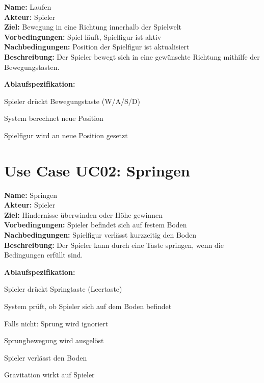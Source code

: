 \documentclass{article}
\begin{document}
\textbf{Name:} Laufen \\
\textbf{Akteur:} Spieler \\
\textbf{Ziel:} Bewegung in eine Richtung innerhalb der Spielwelt \\
\textbf{Vorbedingungen:} Spiel läuft, Spielfigur ist aktiv \\
\textbf{Nachbedingungen:} Position der Spielfigur ist aktualisiert \\
\textbf{Beschreibung:} Der Spieler bewegt sich in eine gewünschte Richtung mithilfe der Bewegungstasten.

\textbf{Ablaufspezifikation:}
\begin{description}[style=nextline,leftmargin=1.5cm,labelwidth=1.2cm]
  \item[1.] Spieler drückt Bewegungstaste (W/A/S/D)
  \item[2.] System berechnet neue Position
  \item[3.] Spielfigur wird an neue Position gesetzt
\end{description}


\section*{Use Case UC02: Springen}

\textbf{Name:} Springen \\
\textbf{Akteur:} Spieler \\
\textbf{Ziel:} Hindernisse überwinden oder Höhe gewinnen \\
\textbf{Vorbedingungen:} Spieler befindet sich auf festem Boden \\
\textbf{Nachbedingungen:} Spielfigur verlässt kurzzeitig den Boden \\
\textbf{Beschreibung:} Der Spieler kann durch eine Taste springen, wenn die Bedingungen erfüllt sind.

\textbf{Ablaufspezifikation:}
\begin{description}[style=nextline,leftmargin=1.5cm,labelwidth=1.2cm]
  \item[1.] Spieler drückt Springtaste (Leertaste)
  \item[2.] System prüft, ob Spieler sich auf dem Boden befindet
  \item[2a.] Falls nicht: Sprung wird ignoriert
  \item[3.] Sprungbewegung wird ausgelöst
  \item[3.1.] Spieler verlässt den Boden
  \item[3.2.] Gravitation wirkt auf Spieler
\end{description}
\end{document}
